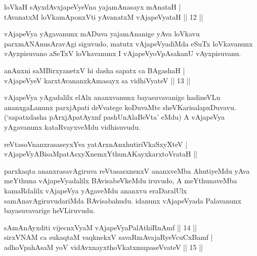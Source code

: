 
\begin{shl}
loVkaH sAyxdAvxjapeVyeVna yajamAnasayx mAnataH | \\
tAvanatxM loVkamAponxVti yAvanatxM vAjapeVyataH \hfill|| 12 || 
\end{shl}

\begin{artha}
vAjapeVya yAgavanunx mADuva yajamAnanige yAva loVkavu 
parxmANAnusAravAgi siguvudo, matutx vAjapeVyadiMda eSuTx loVkavanunx 
vAyxpisuvano aSeTxV loVkavanunx I vAjapeVyoVpAsakanU vAyxpisuvanu.
\end{artha}


\begin{shl}
anAnxni saMBirxyanetxV hi dasha sapatx ca BAgashaH | \\
vAjapeVyeV karxtAvananxkAmasayx sa vidhiVyateV \hfill|| 13 || 
\end{shl}

\begin{artha}
vAjapeVya yAgadalilx elAlx ananxvanunx bayasuvavanige hadineVLu 
ananxgaLanunx parxjApati deVvatege koDuvaMte sheVKarisalapxDuvavu. 
(`sapatxdasha pArxjApatAyxnf pashUnAlaBeVta' eMdu) A vAjapeVya 
yAgavanunx kataRvayxveMdu vidhisuvudu.
\end{artha}

\begin{shl}
reVtasoV\s nanxrasaseyxYva yatArxnAnxhutiriVkaSxyXteV | \\
vAjapeVyABisaMpatAsxyXnemxYthunAKayxkarxtoVrataH || 
\end{shl}

\begin{artha}
parxkaqta ananxrasavAgiruva reVtasasxnenxV ananxveMba AhutiyeMdu yAva meYthuna vAjapeVyadalilx BAvisabeVkeMdu iruvudo, A meYthunaveMba kamaRdalilx vAjapeVya yAgaveMdu ananxvu eraDaralUlx samAnavAgiruvudariMda BAvisabahudu. idanunx vAjapeVyada Palavanunx bayasuvavarige heVLiruvudu.
\end{artha}


\begin{shl}
sAmAnAyxditi vijecnxVyaM vAjapeVyaPalAthiRnAmf \hfill|| 14 || \\
sirxVNAM ca sukaqtaM vaqknekxV savaRmAvajaRyeVcuCxBamf | \\
adhoVpahAsaM yoV vidAvxnayxthoVkatxmupaseVvateV \hfill|| 15 || 
\end{shl}

